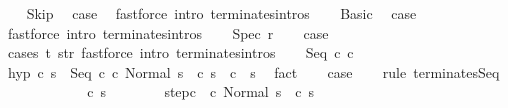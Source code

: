\begin{isabellebody}
\ \ \isamarkupfalse%
\ Skip\ \isamarkupfalse%
\ {\isacharquery}case\ \isamarkupfalse%
\ {\isacharparenleft}fastforce\ intro{\isacharcolon}\ terminates{\isachardot}intros{\isacharparenright}\isanewline
{}\isamarkupfalse%
\isanewline
\ \ \isamarkupfalse%
\ Basic\ \isamarkupfalse%
\ {\isacharquery}case\ \isamarkupfalse%
\ {\isacharparenleft}fastforce\ intro{\isacharcolon}\ terminates{\isachardot}intros{\isacharparenright}\isanewline
{}\isamarkupfalse%
\isanewline
\ \ \isamarkupfalse%
\ {\isacharparenleft}Spec\ r{\isacharparenright}\isanewline
\ \ \isamarkupfalse%
\ {\isacharquery}case\isanewline
\ \ \ \ \isamarkupfalse%
\ {\isacharparenleft}cases\ {\isachardoublequoteopen}{\isasymexists}t{\isachardot}\ {\isacharparenleft}s{\isacharcomma}t{\isacharparenright}{\isasymin}r{\isachardoublequoteclose}{\isacharparenright}\ {\isacharparenleft}fastforce\ intro{\isacharcolon}\ terminates{\isachardot}intros{\isacharparenright}{\isacharplus}\isanewline
{}\isamarkupfalse%
\isanewline
\ \ \isamarkupfalse%
\ {\isacharparenleft}Seq\ c\ c\isanewline
\ \ \isamarkupfalse%
\ hyp{\isacharcolon}\ {\isachardoublequoteopen}{\isasymAnd}c{\isacharprime}\ s{\isacharprime}{\isachardot}\ {\isasymGamma}{\isasymturnstile}\ {\isacharparenleft}Seq\ c\ c\ Normal\ s{\isacharparenright}\ {\isasymrightarrow}\ {\isacharparenleft}c{\isacharprime}{\isacharcomma}\ s{\isacharprime}{\isacharparenright}\ {\isasymLongrightarrow}\ {\isasymGamma}{\isasymturnstile}c{\isacharprime}\ {\isasymdown}\ s{\isacharprime}{\isachardoublequoteclose}\ \isamarkupfalse%
\ fact\isanewline
\ \ \isamarkupfalse%
\ {\isacharquery}case\isanewline
\ \ \isamarkupfalse%
\ {\isacharparenleft}rule\ terminates{\isachardot}Seq{\isacharparenright}\isanewline
\ \ \ \ \isacommand{{\isacharbraceleft}}\isamarkupfalse%
\isanewline
\ \ \ \ \ \ \isamarkupfalse%
\ c{\isacharprime}\ s{\isacharprime}\isanewline
\ \ \ \ \ \ \isamarkupfalse%
\ step{\isacharunderscore}c\ {\isachardoublequoteopen}{\isasymGamma}{\isasymturnstile}\ {\isacharparenleft}c\ Normal\ s{\isacharparenright}\ {\isasymrightarrow}\ {\isacharparenleft}c{\isacharprime}{\isacharcomma}\ s{\isacharprime}{\isacharparenright}{\isachardoublequoteclose}\isanewline

\end{isabellebody}
